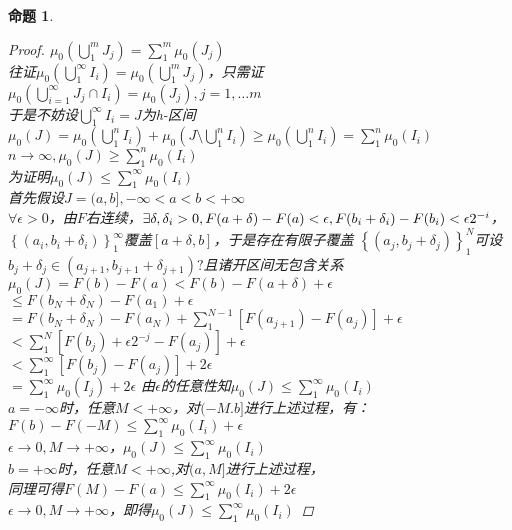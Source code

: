 \documentclass[12pt, a4paper, oneside]{ctexbook}
\newtheorem{proposition}[theorem]{命题}
\begin{document}
\begin{proposition}
\begin{proof}
        $\mu_0(\bigcup_1^mJ_j)=\sum_1^m\mu_0(J_j)$\\
        往证$\mu_0(\bigcup_1^{\infty}I_i)=\mu_0(\bigcup_1^mJ_j)$，只需证$\mu_0(\bigcup_{i=1}^{\infty}J_j\cap I_i)=\mu_0(J_j),j=1,\dots m$\\
        于是不妨设$\bigcup_1^{\infty}I_i=J$为h-区间\\
        $\mu_0(J)=\mu_0(\bigcup_1^nI_i)+\mu_0(J\setminus\bigcup_1^nI_i)\geq\mu_0(\bigcup_1^nI_i)=\sum_1^n\mu_0(I_i)$\\
        $n\to\infty,\mu_0(J)\geq\sum_1^n\mu_0(I_i)$\\
        为证明$\mu_0(J)\leq\sum_1^{\infty}\mu_0(I_i)$\\
        首先假设$J=(a,b],-\infty<a<b<+\infty$\\
        $\forall \epsilon>0$，由$F$右连续，$\exists \delta,\delta_i>0,F(a+\delta)-F(a)<\epsilon,\\
        F(b_i+\delta_i)-F(b_i)<\epsilon 2^{-i}$，$\left\{(a_i,b_i+\delta_i)\right\}_1^{\infty}$覆盖$[a+\delta,b]$，于是存在有限子覆盖
        $\left\{(a_j,b_j+\delta_j)\right\}_1^N$可设$b_j+\delta_j\in(a_{j+1},b_{j+1}+\delta_{j+1})?$且诸开区间无包含关系\\
        $\mu_0(J)=F(b)-F(a)<F(b)-F(a+\delta)+\epsilon$\\
        $\leq F(b_N+\delta_N)-F(a_1)+\epsilon$\\
        $=F(b_N+\delta_N)-F(a_N)+\sum_1^{N-1}[F(a_{j+1})-F(a_j)]+\epsilon$\\
        $<\sum_1^N[F(b_j)+\epsilon 2^{-j}-F(a_j)]+\epsilon$\\
        $<\sum_1^{\infty}[F(b_j)-F(a_j)]+2\epsilon$\\
        $=\sum_1^{\infty}\mu_0(I_j)+2\epsilon$
        由$\epsilon$的任意性知$\mu_0(J)\leq \sum_1^{\infty}\mu_0(I_i)$\\
        $a=-\infty$时，任意$M<+\infty$，对$(-M.b]$进行上述过程，有：\\
        $F(b)-F(-M)\leq\sum_1^{\infty}\mu_0(I_i)+\epsilon$\\
        $\epsilon\to 0,M\to +\infty$，$\mu_0(J)\leq\sum_1^{\infty}\mu_0(I_i)$\\
        $b=+\infty$时，任意$M<+\infty$,对$(a,M]$进行上述过程，\\
        同理可得$F(M)-F(a)\leq\sum_1^{\infty}\mu_0(I_i)+2\epsilon$\\
        $\epsilon\to 0,M\to +\infty$，即得$\mu_0(J)\leq \sum_1^{\infty}\mu_0(I_i)$

    \end{proof}
\end{proposition}
\end{document}

